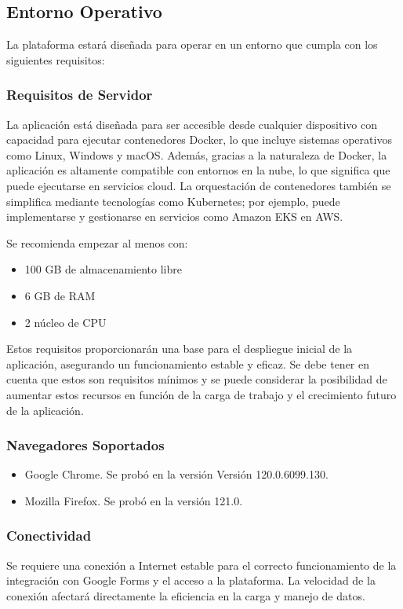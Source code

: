 \subsection{Entorno Operativo}

La plataforma estará diseñada para operar en un entorno que cumpla con los siguientes requisitos:

\subsubsection{Requisitos de Servidor}
La aplicación está diseñada para ser accesible desde cualquier dispositivo con capacidad para ejecutar contenedores Docker, lo que incluye sistemas operativos como Linux, Windows y macOS. Además, gracias a la naturaleza de Docker, la aplicación es altamente compatible con entornos en la nube, lo que significa que puede ejecutarse en servicios cloud. La orquestación de contenedores también se simplifica mediante tecnologías como Kubernetes; por ejemplo, puede implementarse y gestionarse en servicios como Amazon EKS en AWS.

Se recomienda empezar al menos con:
\begin{itemize}
    \item 100 GB de almacenamiento libre
    \item 6 GB de RAM
    \item 2 núcleo de CPU
\end{itemize}

Estos requisitos proporcionarán una base para el despliegue inicial de la aplicación, asegurando un funcionamiento estable y eficaz. Se debe tener en cuenta que estos son requisitos mínimos y se puede considerar la posibilidad de aumentar estos recursos en función de la carga de trabajo y el crecimiento futuro de la aplicación.

\subsubsection{Navegadores Soportados}

\begin{itemize}
    \item Google Chrome. Se probó en la versión Versión 120.0.6099.130.
    \item Mozilla Firefox. Se probó en la versión 121.0.
\end{itemize}

\subsubsection{Conectividad}
Se requiere una conexión a Internet estable para el correcto funcionamiento de la integración con Google Forms y el acceso a la plataforma. La velocidad de la conexión afectará directamente la eficiencia en la carga y manejo de datos.

